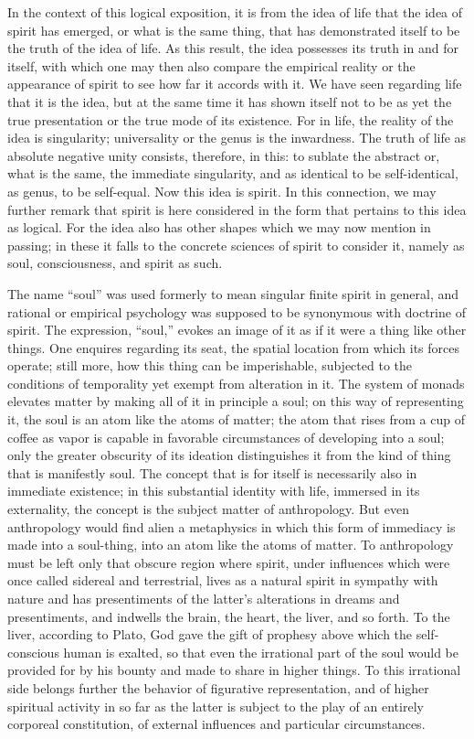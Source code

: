 In the context of this logical exposition,
it is from the idea of life that
the idea of spirit has emerged,
or what is the same thing, that has demonstrated
itself to be the truth of the idea of life.
As this result, the idea possesses its truth in and for itself,
with which one may then also compare the empirical reality
or the appearance of spirit to see how far it accords with it.
We have seen regarding life that it is the idea,
but at the same time it has shown itself
not to be as yet the true presentation
or the true mode of its existence.
For in life, the reality of the idea is singularity;
universality or the genus is the inwardness.
The truth of life as absolute negative unity consists,
therefore, in this:
to sublate the abstract or, what is the same,
the immediate singularity,
and as identical to be self-identical,
as genus, to be self-equal.
Now this idea is spirit.
In this connection, we may further remark
that spirit is here considered in the form
that pertains to this idea as logical.
For the idea also has other shapes
which we may now mention in passing;
in these it falls to the concrete sciences
of spirit to consider it, namely
as soul, consciousness, and spirit as such.

The name “soul” was used formerly to mean
singular finite spirit in general,
and rational or empirical psychology was
supposed to be synonymous with doctrine of spirit.
The expression, “soul,” evokes an image of it
as if it were a thing like other things.
One enquires regarding its seat,
the spatial location from which its forces operate;
still more, how this thing can be imperishable,
subjected to the conditions of temporality yet exempt
from alteration in it.
The system of monads elevates matter by making all
of it in principle a soul;
on this way of representing it, the soul is an
atom like the atoms of matter;
the atom that rises from a cup of coffee as vapor
is capable in favorable circumstances of developing into a soul;
only the greater obscurity of its ideation distinguishes it
from the kind of thing that is manifestly soul.
The concept that is for itself is
necessarily also in immediate existence;
in this substantial identity with life,
immersed in its externality,
the concept is the subject matter of anthropology.
But even anthropology would find alien a metaphysics
in which this form of immediacy is made into a soul-thing,
into an atom like the atoms of matter.
To anthropology must be left only that obscure region where spirit,
under influences which were once called sidereal and terrestrial,
lives as a natural spirit in sympathy with nature
and has presentiments of the latter's alterations
in dreams and presentiments,
and indwells the brain, the heart, the liver, and so forth.
To the liver, according to Plato,
God gave the gift of prophesy
above which the self-conscious human is exalted,
so that even the irrational part of the soul
would be provided for by his bounty
and made to share in higher things.
To this irrational side belongs further the
behavior of figurative representation,
and of higher spiritual activity in so far
as the latter is subject to the play
of an entirely corporeal constitution,
of external influences and particular circumstances.

